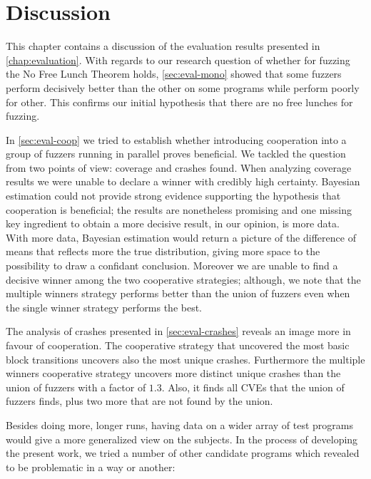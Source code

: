 \chapter{Discussion}
\label{chap:discussion}

This chapter contains a discussion of the evaluation results presented in
\autoref{chap:evaluation}. With regards to our research question of whether for
fuzzing the No Free Lunch Theorem holds, \autoref{sec:eval-mono} showed that
some fuzzers perform decisively better than the other on some programs while
perform poorly for other. This confirms our initial hypothesis that there are no
free lunches for fuzzing.

In \autoref{sec:eval-coop} we tried to establish whether introducing cooperation
into a group of fuzzers running in parallel proves beneficial. We tackled the
question from two points of view: coverage and crashes found. When analyzing
coverage results we were unable to declare a winner with credibly high
certainty. Bayesian estimation could not provide strong evidence supporting the
hypothesis that cooperation is beneficial; the results are nonetheless promising
and one missing key ingredient to obtain a more decisive result, in our opinion,
is more data. With more data, Bayesian estimation would return a picture of the
difference of means that reflects more the true distribution, giving more space
to the possibility to draw a confidant conclusion. Moreover we are unable to
find a decisive winner among the two cooperative strategies; although, we note
that the multiple winners strategy performs better than the union of fuzzers
even when the single winner strategy performs the best.

The analysis of crashes presented in \autoref{sec:eval-crashes} reveals an image
more in favour of cooperation. The cooperative strategy that uncovered the most
basic block transitions uncovers also the most unique crashes. Furthermore the
multiple winners cooperative strategy uncovers more distinct unique crashes than
the union of fuzzers with a factor of $1.3$. Also, it finds all \acp{CVE} that
the union of fuzzers finds, plus two more that are not found by the union.

Besides doing more, longer runs, having data on a wider array of test programs
would give a more generalized view on the subjects. In the process of developing
the present work, we tried a number of other candidate programs which revealed
to be problematic in a way or another:

